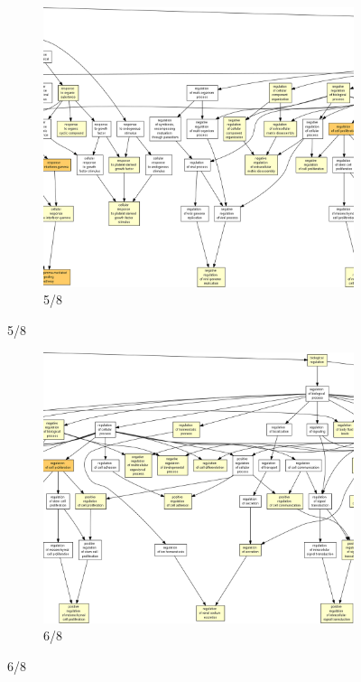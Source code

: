 \begin{figure}[p]
\ContinuedFloat
\begin{subfigure}{\textwidth}
\includegraphics[width=\textwidth]
{Figures/tfc-go-all-graph/tfc-go-all-graph_4.png}
\caption{5/8}
\end{subfigure}
\end{figure}

\begin{figure}[p]
\ContinuedFloat
\begin{subfigure}{\textwidth}
\includegraphics[width=\textwidth]
{Figures/tfc-go-all-graph/tfc-go-all-graph_5.png}
\caption{6/8}
\end{subfigure}
\end{figure}

